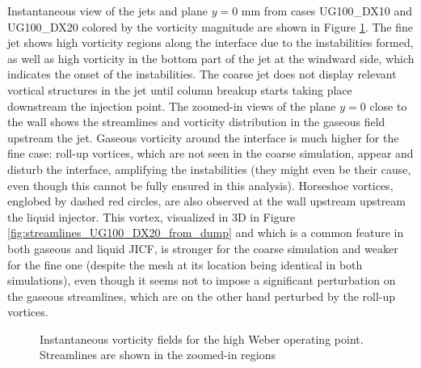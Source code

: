 
Instantaneous view of the jets and plane $y = 0$ mm from cases UG100\_DX10 and UG100\_DX20 colored by the vorticity magnitude are shown in Figure \ref{fig:JICF_instabilities_vorticity}. The fine jet shows high vorticity regions along the interface due to the instabilities formed, as well as high vorticity in the bottom part of the jet at the windward side, which indicates the onset of the instabilities. The coarse jet does not display relevant vortical structures in the jet until column breakup starts taking place downstream the injection point. The zoomed-in views of the plane $y = 0$ close to the wall shows the streamlines and vorticity distribution in the gaseous field upstream the jet. Gaseous vorticity around the interface is much higher for the fine case: roll-up vortices, which are not seen in the coarse simulation, appear and disturb the interface, amplifying the instabilities (they might even be their cause, even though this cannot be fully ensured in this analysis). Horseshoe vortices, englobed by dashed red circles, are also observed at the wall upstream upstream the liquid injector. This vortex, visualized in 3D in Figure \ref{fig:streamlines_UG100_DX20_from_dump} and which is a common feature in both gaseous  and liquid  JICF, is stronger for the coarse simulation and weaker for the fine one (despite the mesh at its location being identical in both simulations), even though it seems not to impose a significant perturbation on the gaseous streamlines, which are on the other hand perturbed by the roll-up vortices.


\begin{figure}[ht]
\flushleft
{}
\caption[Instantaneous vorticity fields for the high Weber operating point.]{Instantaneous vorticity fields for the high Weber operating point. Streamlines are shown in the zoomed-in regions}
\label{fig:JICF_instabilities_vorticity}
\end{figure}

